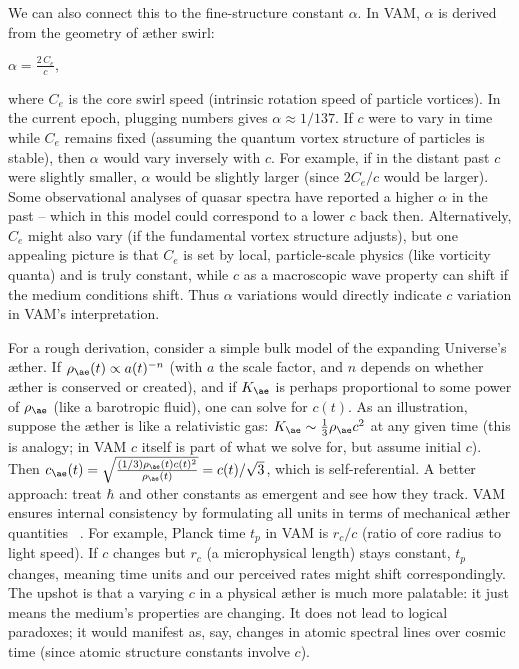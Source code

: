 \documentclass[a4paper, aps,preprint,superscriptaddress, 12pt]{revtex4}
\begin{document}
We can also connect this to the fine-structure constant $\alpha$. In VAM, $\alpha$ is derived from the geometry of æther swirl:

$\alpha = \frac{2\,C_e}{c},$

where $C_e$ is the core swirl speed (intrinsic rotation speed of particle vortices). In the current epoch, plugging numbers gives $\alpha\approx1/137$. If $c$ were to vary in time while $C_e$ remains fixed (assuming the quantum vortex structure of particles is stable), then $\alpha$ would vary inversely with $c$. For example, if in the distant past $c$ were slightly smaller, $\alpha$ would be slightly larger (since $2C_e/c$ would be larger). Some observational analyses of quasar spectra have reported a higher $\alpha$ in the past – which in this model could correspond to a lower $c$ back then. Alternatively, $C_e$ might also vary (if the fundamental vortex structure adjusts), but one appealing picture is that $C_e$ is set by local, particle-scale physics (like vorticity quanta) and is truly constant, while $c$ as a macroscopic wave property can shift if the medium conditions shift. Thus $\alpha$ variations would directly indicate $c$ variation in VAM’s interpretation.


For a rough derivation, consider a simple bulk model of the expanding Universe’s æther. If $\rho_{\ae}(t) \propto a(t)^{-n}$ (with $a$ the scale factor, and $n$ depends on whether æther is conserved or created), and if $K_{\ae}$ is perhaps proportional to some power of $\rho_{\ae}$ (like a barotropic fluid), one can solve for $c(t)$. As an illustration, suppose the æther is like a relativistic gas: $K_{\ae}\sim \frac{1}{3}\rho_{\ae}c^2$ at any given time (this is analogy; in VAM $c$ itself is part of what we solve for, but assume initial $c$). Then $c_{\ae}(t) = \sqrt{\frac{(1/3)\rho_{\ae}(t)c(t)^2}{\rho_{\ae}(t)}} = c(t)/\sqrt{3}$, which is self-referential. A better approach: treat $\hbar$ and other constants as emergent and see how they track. VAM ensures internal consistency by formulating all units in terms of mechanical æther quantities~\cite{Iskandarani2025c} . For example, Planck time $t_p$ in VAM is $r_c/c$ (ratio of core radius to light speed). If $c$ changes but $r_c$ (a microphysical length) stays constant, $t_p$ changes, meaning time units and our perceived rates might shift correspondingly. The upshot is that a varying $c$ in a physical æther is much more palatable: it just means the medium’s properties are changing. It does not lead to logical paradoxes; it would manifest as, say, changes in atomic spectral lines over cosmic time (since atomic structure constants involve $c$).
\end{document}
